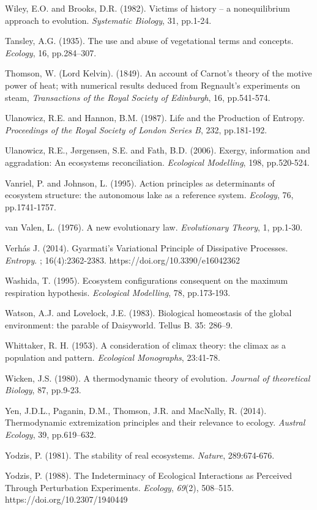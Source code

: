 \documentclass[11pt,letterpaper,]{paper}
\begin{document}
Wiley, E.O. and Brooks, D.R. (1982). Victims of history -- a
nonequilibrium approach to evolution. \emph{Systematic Biology}, 31,
pp.1-24.

Tansley, A.G. (1935). The use and abuse of vegetational terms and
concepts. \emph{Ecology}, 16, pp.284--307.

Thomson, W. (Lord Kelvin). (1849). An account of Carnot's theory of the
motive power of heat; with numerical results deduced from Regnault's
experiments on steam, \emph{Transactions of the Royal Society of
Edinburgh}, 16, pp.541-574.

Ulanowicz, R.E. and Hannon, B.M. (1987). Life and the Production of
Entropy. \emph{Proceedings of the Royal Society of London Series B},
232, pp.181-192.

Ulanowicz, R.E., Jørgensen, S.E. and Fath, B.D. (2006). Exergy,
information and aggradation: An ecosystems reconciliation.
\emph{Ecological Modelling}, 198, pp.520-524.

Vanriel, P. and Johnson, L. (1995). Action principles as determinants of
ecosystem structure: the autonomous lake as a reference system.
\emph{Ecology}, 76, pp.1741-1757.

van Valen, L. (1976). A new evolutionary law. \emph{Evolutionary
Theory}, 1, pp.1-30.

Verhás J. (2014). Gyarmati's Variational Principle of Dissipative
Processes. \emph{Entropy}. ; 16(4):2362-2383.
https://doi.org/10.3390/e16042362

Washida, T. (1995). Ecosystem configurations consequent on the maximum
respiration hypothesis. \emph{Ecological Modelling}, 78, pp.173-193.

Watson, A.J. and Lovelock, J.E. (1983). Biological homeostasis of the
global environment: the parable of Daisyworld. Tellus B. 35: 286--9.

Whittaker, R. H. (1953). A consideration of climax theory: the climax as
a population and pattern. \emph{Ecological Monographs}, 23:41-78.

Wicken, J.S. (1980). A thermodynamic theory of evolution. \emph{Journal
of theoretical Biology}, 87, pp.9-23.

Yen, J.D.L., Paganin, D.M., Thomson, J.R. and MacNally, R. (2014).
Thermodynamic extremization principles and their relevance to ecology.
\emph{Austral Ecology}, 39, pp.619--632.

Yodzis, P. (1981). The stability of real ecosystems. \emph{Nature},
289:674-676.

Yodzis, P. (1988). The Indeterminacy of Ecological Interactions as
Perceived Through Perturbation Experiments. \emph{Ecology},
\emph{69}(2), 508--515. https://doi.org/10.2307/1940449
\end{document}
